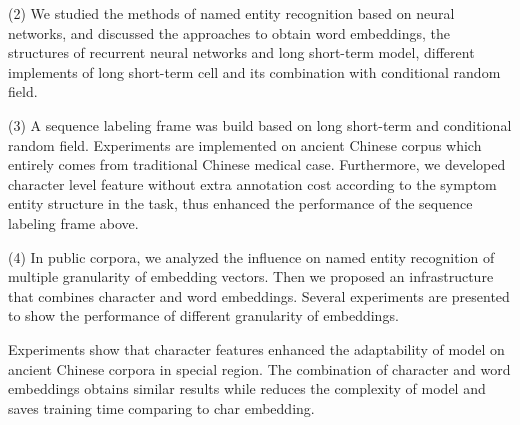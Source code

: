 (2) We studied the methods of named entity recognition based on neural networks, and discussed the approaches to obtain word embeddings, the structures of recurrent neural networks and long short-term model, different implements of long short-term cell and its combination with conditional random field.

(3) A sequence labeling frame was build based on long short-term and conditional random field. Experiments are implemented on ancient Chinese corpus which entirely comes from traditional Chinese medical case. Furthermore, we developed character level feature without extra annotation cost according to the symptom entity structure in the task, thus enhanced the performance of the sequence labeling frame above.

(4) In public corpora, we analyzed the influence on named entity recognition of multiple granularity of embedding vectors. Then we proposed an infrastructure that combines character and word embeddings. Several experiments are presented to show the performance of different granularity of embeddings.

Experiments show that character features enhanced the adaptability of model on ancient Chinese corpora in special region. The combination of character and word embeddings obtains similar results while reduces the complexity of model and saves training time comparing to char embedding.

